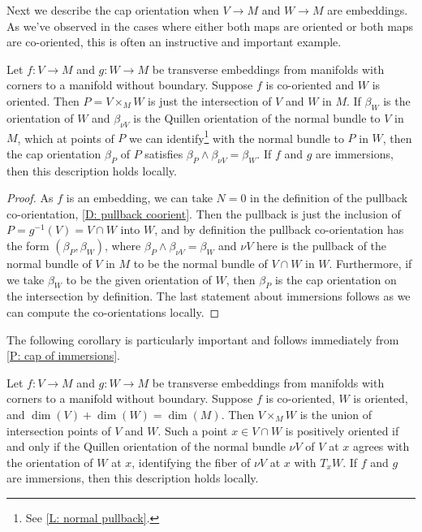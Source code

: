Next we describe the cap orientation when $V \to M$ and $W \to M$ are embeddings.
As we've observed in the cases where either both maps are oriented or both maps are co-oriented, this is often an instructive and important example.

\begin{proposition}\label{P: cap of immersions}
	Let $f \colon V \to M$ and $g \colon W \to M$ be transverse embeddings from manifolds with corners to a manifold without boundary.
	Suppose $f$ is co-oriented and $W$ is oriented.
	Then $P = V \times_M W$ is just the intersection of $V$ and $W$ in $M$.
	If $\beta_W$ is the orientation of $W$ and $\beta_{\nu V}$ is the Quillen orientation of the normal bundle to $V$ in $M$, which at points of $P$ we can identify\footnote{See \cref{L: normal pullback}.} with the normal bundle to $P$ in $W$, then the cap orientation $\beta_P$ of $P$ satisfies $\beta_P \wedge \beta_{\nu V} = \beta_W$.
	If $f$ and $g$ are immersions, then this description holds locally.
\end{proposition}

\begin{proof}
	As $f$ is an embedding, we can take $N = 0$ in the definition of the pullback co-orientation, \cref{D: pullback coorient}.
	Then the pullback is just the inclusion of $P = g^{-1}(V) = V \cap W$ into $W$, and by definition the pullback co-orientation has the form $(\beta_P,\beta_W)$, where $\beta_P \wedge \beta_{\nu V} = \beta_W$ and $\nu V$ here is the pullback of the normal bundle of $V$ in $M$ to be the normal bundle of $V \cap W$ in $W$.
	Furthermore, if we take $\beta_W$ to be the given orientation of $W$, then $\beta_P$ is the cap orientation on the intersection by definition.
	The last statement about immersions follows as we can compute the co-orientations locally.
\end{proof}

The following corollary is particularly important and follows immediately from \cref{P: cap of immersions}.

\begin{corollary}\label{C: complementary cap}
	Let $f \colon V \to M$ and $g \colon W \to M$ be transverse embeddings from manifolds with corners to a manifold without boundary.
	Suppose $f$ is co-oriented, $W$ is oriented, and $\dim(V) + \dim(W) = \dim(M)$.
	Then $V \times_M W$ is the union of intersection points of $V$ and $W$.
	Such a point $x \in V \cap W$ is positively oriented if and only if the Quillen orientation of the normal bundle $\nu V$ of $V$ at $x$ agrees with the orientation of $W$ at $x$, identifying the fiber of $\nu V$ at $x$ with $T_xW$.
	If $f$ and $g$ are immersions, then this description holds locally.
\end{corollary}

